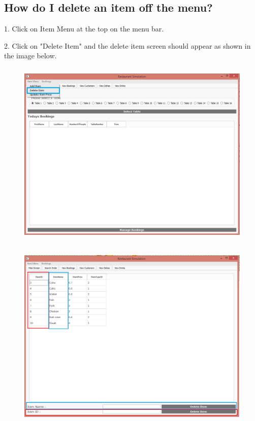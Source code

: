 \newpage

\subsection{How do I delete an item off the menu?}
1. Click on Item Menu at the top on the menu bar.

2. Click on "Delete Item" and the delete item screen should appear as shown in the image below.

\begin{figure}[H]
    \includegraphics[height = 9cm]{./Manual/images/DeleteItem1} 
    \caption{} \label{fig:deleteitem1}
\end{figure}


\begin{figure}[H]
    \includegraphics[height = 9cm]{./Manual/images/DeleteItem2} 
    \caption{} \label{fig:deleteitem2}
\end{figure}

